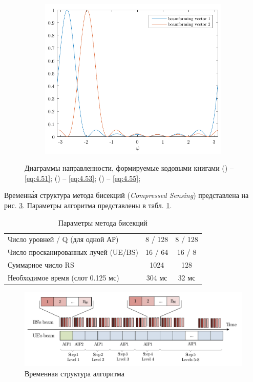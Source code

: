 \begin{figure}[ht!]
\begin{subfigure}{0.49\linewidth}
    \centering
    \includegraphics[width=\linewidth]{figs/fig4.22}
    \caption{}
    \label{fig:4.22}
\end{subfigure}
\caption{Диаграммы направленности, формируемые кодовыми книгами 
() -- \eqref{eq:4.51};
() -- \eqref{eq:4.53};
() -- \eqref{eq:4.55};
}
\label{fig:4.21-full}
\end{figure}

Временн\'{а}я структура метода бисекций (\textit{Compressed Sensing}) представлена на рис. \ref{fig:4.23}.
Параметры алгоритма представлены в табл. \ref{tab:4.5}.
\begin{table}[H]
    \centering
    \caption{Параметры метода бисекций}
    \label{tab:4.5}
    \begin{tabular}{lcc}
        \toprule
        \midrule
        Число уровней / Q (для одной АР)              & 8 / 128 & 8 / 128 \\
        Число просканированных \newline лучей (UE/BS) & 16 / 64 & 16 / 8  \\
        Суммарное число RS                            & 1024    & 128     \\
        Необходимое время (слот 0.125 мс)             & 304 мс  & 32 мс   \\
        \bottomrule
    \end{tabular}
\end{table}
\begin{figure}[H]
    \centering
    \includegraphics[width=\linewidth]{figs/fig4.23}
    \caption{Временная структура алгоритма \ACS{}}
    \label{fig:4.23}
\end{figure}
